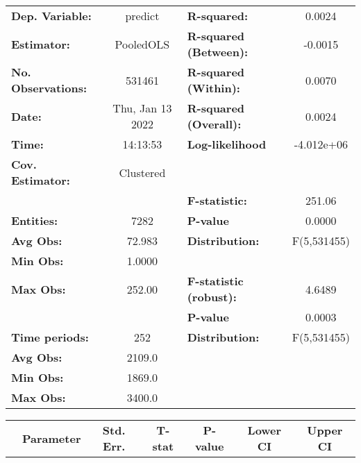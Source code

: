 \begin{center}
\begin{tabular}{lclc}
\toprule
\textbf{Dep. Variable:}    &      predict       & \textbf{  R-squared:         }   &      0.0024      \\
\textbf{Estimator:}        &     PooledOLS      & \textbf{  R-squared (Between):}  &     -0.0015      \\
\textbf{No. Observations:} &       531461       & \textbf{  R-squared (Within):}   &      0.0070      \\
\textbf{Date:}             &  Thu, Jan 13 2022  & \textbf{  R-squared (Overall):}  &      0.0024      \\
\textbf{Time:}             &      14:13:53      & \textbf{  Log-likelihood     }   &    -4.012e+06    \\
\textbf{Cov. Estimator:}   &     Clustered      & \textbf{                     }   &                  \\
\textbf{}                  &                    & \textbf{  F-statistic:       }   &      251.06      \\
\textbf{Entities:}         &        7282        & \textbf{  P-value            }   &      0.0000      \\
\textbf{Avg Obs:}          &       72.983       & \textbf{  Distribution:      }   &   F(5,531455)    \\
\textbf{Min Obs:}          &       1.0000       & \textbf{                     }   &                  \\
\textbf{Max Obs:}          &       252.00       & \textbf{  F-statistic (robust):} &      4.6489      \\
\textbf{}                  &                    & \textbf{  P-value            }   &      0.0003      \\
\textbf{Time periods:}     &        252         & \textbf{  Distribution:      }   &   F(5,531455)    \\
\textbf{Avg Obs:}          &       2109.0       & \textbf{                     }   &                  \\
\textbf{Min Obs:}          &       1869.0       & \textbf{                     }   &                  \\
\textbf{Max Obs:}          &       3400.0       & \textbf{                     }   &                  \\
\bottomrule
\end{tabular}
\begin{tabular}{lcccccc}
                & \textbf{Parameter} & \textbf{Std. Err.} & \textbf{T-stat} & \textbf{P-value} & \textbf{Lower CI} & \textbf{Upper CI}  \\

\end{tabular}
\end{center}
